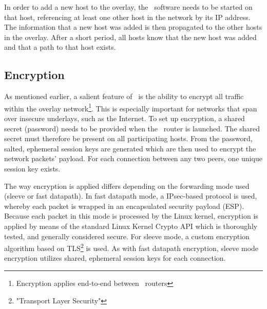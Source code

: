 In order to add a new host to the overlay, the \weave\ software needs to be started on that host, referencing at least one other host in the network by its IP address. The information that a new host was added is then propagated to the other hosts in the overlay. After a short period, all hosts know that the new host was added and that a path to that host exists.

\subsection{Encryption} 
As mentioned earlier, a salient feature of \wnet\ is the ability to encrypt all traffic within the overlay network\footnote{Encryption applies end-to-end between \weave\ routers}. This is especially important for networks that span over insecure underlays, such as the Internet. To set up encryption, a shared secret (password) needs to be provided when the \weave\ router is launched. The shared secret must therefore be present on all participating hosts. From the password, salted, ephemeral session keys are generated which are then used to encrypt the network packets' payload. For each connection between any two peers, one unique session key exists.

The way encryption is applied differs depending on the forwarding mode used (sleeve or fast datapath). In fast datapath mode, a IPsec-based protocol is used, whereby each packet is wrapped in an encapsulated security payload (ESP). Because each packet in this mode is processed by the Linux kernel, encryption is applied by means of the standard Linux Kernel Crypto API which is thoroughly tested, and generally considered secure. For sleeve mode, a custom encryption algorithm based on TLS\footnote{"Transport Layer Security"} is used. As with fast datapath encryption, sleeve mode encryption utilizes shared, ephemeral session keys for each connection.

